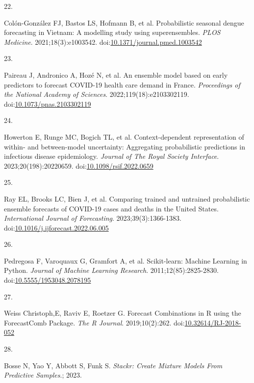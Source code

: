 \documentclass[
  letterpaper,
  DIV=11,
  numbers=noendperiod]{scrartcl}
\newlength{\cslhangindent}
\newlength{\csllabelwidth}
\newenvironment{CSLReferences}[2] %
 {\begin{list}{}{%
  \setlength{\itemindent}{0pt}
  \setlength{\leftmargin}{0pt}
  \setlength{\parsep}{0pt}
  \ifodd #1
   \setlength{\leftmargin}{\cslhangindent}
   \setlength{\itemindent}{-1\cslhangindent}
  \fi
  \setlength{\itemsep}{#2\baselineskip}}}
 {\end{list}}
\newcommand{\CSLLeftMargin}[1]{\parbox[t]{\csllabelwidth}{\strut#1\strut}}
\newcommand{\CSLRightInline}[1]{\parbox[t]{\linewidth - \csllabelwidth}{\strut#1\strut}}
\begin{document}
\begin{CSLReferences}{0}{1}
\CSLLeftMargin{22. }%
\CSLRightInline{Colón-González FJ, Bastos LS, Hofmann B, et al.
Probabilistic seasonal dengue forecasting in {Vietnam}: {A} modelling
study using superensembles. \emph{PLOS Medicine}. 2021;18(3):e1003542.
doi:\href{https://doi.org/10.1371/journal.pmed.1003542}{10.1371/journal.pmed.1003542}}

\CSLLeftMargin{23. }%
\CSLRightInline{Paireau J, Andronico A, Hozé N, et al. An ensemble model
based on early predictors to forecast {COVID}-19 health care demand in
{France}. \emph{Proceedings of the National Academy of Sciences}.
2022;119(18):e2103302119.
doi:\href{https://doi.org/10.1073/pnas.2103302119}{10.1073/pnas.2103302119}}

\CSLLeftMargin{24. }%
\CSLRightInline{Howerton E, Runge MC, Bogich TL, et al.
Context-dependent representation of within- and between-model
uncertainty: Aggregating probabilistic predictions in infectious disease
epidemiology. \emph{Journal of The Royal Society Interface}.
2023;20(198):20220659.
doi:\href{https://doi.org/10.1098/rsif.2022.0659}{10.1098/rsif.2022.0659}}

\CSLLeftMargin{25. }%
\CSLRightInline{Ray EL, Brooks LC, Bien J, et al. Comparing trained and
untrained probabilistic ensemble forecasts of {COVID}-19 cases and
deaths in the {United} {States}. \emph{International Journal of
Forecasting}. 2023;39(3):1366-1383.
doi:\href{https://doi.org/10.1016/j.ijforecast.2022.06.005}{10.1016/j.ijforecast.2022.06.005}}

\CSLLeftMargin{26. }%
\CSLRightInline{Pedregosa F, Varoquaux G, Gramfort A, et al.
Scikit-learn: {Machine} {Learning} in {Python}. \emph{Journal of Machine
Learning Research}. 2011;12(85):2825-2830.
doi:\href{https://doi.org/10.5555/1953048.2078195}{10.5555/1953048.2078195}}

\CSLLeftMargin{27. }%
\CSLRightInline{Weiss Christoph,E, Raviv E, Roetzer G. Forecast
Combinations in R using the ForecastComb Package. \emph{The R Journal}.
2019;10(2):262.
doi:\href{https://doi.org/10.32614/RJ-2018-052}{10.32614/RJ-2018-052}}

\CSLLeftMargin{28. }%
\CSLRightInline{Bosse N, Yao Y, Abbott S, Funk S. \emph{Stackr: {Create}
{Mixture} {Models} {From} {Predictive} {Samples}}.; 2023.}


\end{CSLReferences}
\end{document}
